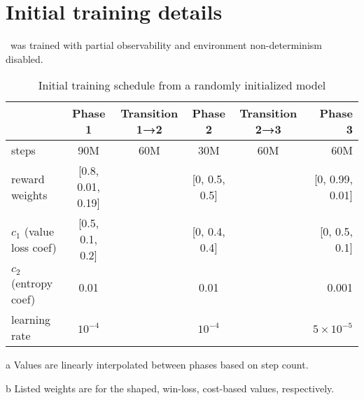 \documentclass[conference,onecolumn]{IEEEtran}
\newcounter{supptable}
\newenvironment{supptable}
  {\renewcommand{\tablename}{Supplemental Table}\setcounter{table}{\value{supptable}}\addtocounter{supptable}{1}\begin{table}}
  {\end{table}\setcounter{supptable}{\value{table}}}
\begin{document}
\section{Initial training details}
\label{appendix:initial-training-details}
\agentName\ was trained with partial observability and environment non-determinism disabled.

\begin{supptable}[H]
    \centering
    \begin{threeparttable}
    \caption{Initial training schedule from a randomly initialized model}
    \label{tab:initial-training-schedule}
    \begin{tabular}{lccccr}
    \toprule
     & Phase 1 & Transition 1→2\tnote{a} & Phase 2 & Transition 2→3\tnote{a} & Phase 3 \\
    \midrule
    steps & 90M & 60M & 30M & 60M & 60M \\
    reward weights\tnote{b} & [0.8, 0.01, 0.19] &  & [0, 0.5, 0.5] &  & [0, 0.99, 0.01] \\
    $c_1$ (value loss coef)\tnote{b} & [0.5, 0.1, 0.2] &  & [0, 0.4, 0.4] &  & [0, 0.5, 0.1]\\
    $c_2$ (entropy coef)& 0.01 & & 0.01 & & 0.001 \\
    learning rate & $10^{-4}$ & & $10^{-4}$ & & $5 \times 10^{-5}$\\
    \bottomrule
    \end{tabular}
    \begin{tablenotes}
       \item[a] Values are linearly interpolated between phases based on step count.
       \item[b] Listed weights are for the shaped, win-loss, cost-based values, respectively.
    \end{tablenotes}
    \end{threeparttable}
\end{supptable}
\end{document}
